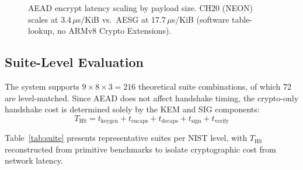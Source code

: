 \begin{figure}[t]
\centering
{}
\caption{AEAD encrypt latency scaling by payload size.  CH20 (NEON)
  scales at 3.4\,$\mu$s/KiB vs.\ AESG at 17.7\,$\mu$s/KiB (software
  table-lookup, no ARMv8 Crypto Extensions).}
\label{fig:aead_scaling}
\end{figure}

\subsection{Suite-Level Evaluation}
\label{sec:suite}

The system supports $9 \times 8 \times 3 = 216$ theoretical suite
combinations, of which 72 are level-matched.  Since AEAD does not
affect handshake timing, the crypto-only handshake cost is determined
solely by the KEM and SIG components:
\begin{equation}
T_\text{HS} = t_\text{keygen} + t_\text{encaps} + t_\text{decaps}
            + t_\text{sign} + t_\text{verify}
\label{eq:ths}
\end{equation}

Table~\ref{tab:suite} presents representative suites per NIST level,
with $T_\text{HS}$ reconstructed from primitive benchmarks to isolate
cryptographic cost from network latency.

